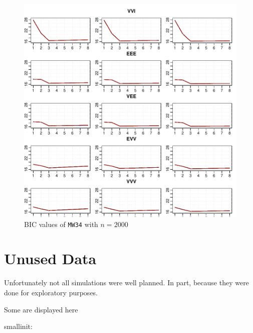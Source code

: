 \begin{figure}[h!]
    \centering
\includegraphics{App_plots-figmw51bicsecond}
    \caption{BIC values of {\tt MW34} with $n=2000$}
    \label{fig:bicmw34second}
\end{figure}

\section{Unused Data}

Unfortunately not all simulations were well planned. In part, because they were
done for exploratory purposes.

Some are displayed here

smallinit:



